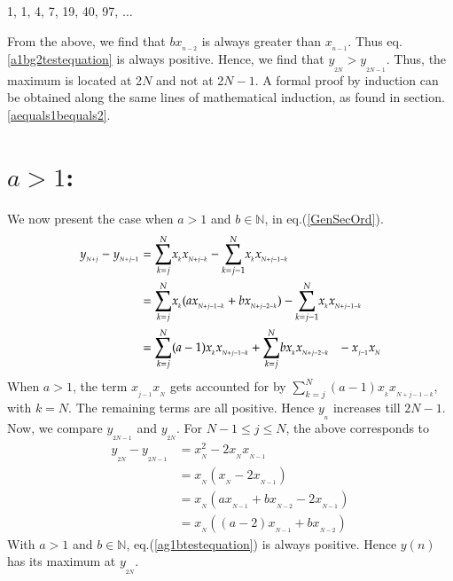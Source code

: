 \begin{multicols}{2}
\vspace{-.7cm}

\begin{center}
1, 1, 4, 7, 19, 40, 97, $\ldots$
\end{center}

\vspace{-.7cm}

From the above, we find that $b x_{_{n-2}}$ is always greater than $x_{_{n-1}}$. Thus eq.\ref{a1bg2testequation} is always positive. Hence, we find that $y_{_{2N}} > y_{_{2N-1}}$. Thus, the maximum is located at 2$N$ and not at 2$N-1$. A formal proof by induction can be obtained along the same lines of mathematical induction, as found in section. \ref{aequals1bequals2}.

\vspace{-.5cm}

\section*{\underline{{$a>1$}}:}
We now present the case when $a > 1$ and $b \in \mathbb N$, in eq.(\ref{GenSecOrd}).
{\fontsize{8}{9}\selectfont\begin{align}
y_{_{N+j}} - y_{_{N+j-1}} &= \displaystyle{\sum_{k=j}^{N}}x_{_{k}}x_{_{N+j-k}} -  \displaystyle{\sum_{k=j-1}^{N}}x_{_k}x_{_{N+j-1-k}}\nonumber\\
&=\displaystyle{\sum_{k=j}^{N}}x_{_{k}}(a x_{_{N+j-1-k}}+b x_{_{N+j-2-k}}) -  \displaystyle{\sum_{k=j-1}^{N}}x_{_k}x_{_{N+j-1-k}}\nonumber\\
&= \displaystyle{\sum_{k=j}^{N}}(a-1)x_{_{k}}x_{_{N+j-1-k}} + \displaystyle{\sum_{k=j}^{N}}bx_{_{k}}x_{_{N+j-2-k}} \hspace{0.1in}- x_{_{j-1}}x_{_N}\label{eq-18.8}
\end{align}}
When $a >1$, the term $x_{_{j-1}}x_{_N}$ gets accounted for by $\displaystyle{\sum_{k=j}^{N}}(a-1)x_{_{k}}x_{_{N+j-1-k}}$, with $k=N$. The remaining terms are all positive. Hence $y_{_n}$ increases till $2N-1$. Now, we compare $y_{_{2N-1}}$ and $y_{_{2N}}$.
For\hspace{0.1in} $N-1 \leq j \leq N$,\hspace{0.1in} the above corresponds to
\begin{align}
y_{_{2N}} - y_{_{2N-1}} &= x_{_N}^2 - 2x_{_N}x_{_{N-1}}\label{eq-18.9}\\
&= x_{_N}(x_{_N} - 2x_{_{N-1}})\label{eq-18.10}\\[.5cm]
&= x_{_N}(a x_{_{N-1}}+ b x_{_{N-2}}- 2x_{_{N-1}})\label{eq-18.11}\\
&= x_{_N}((a-2) x_{_{N-1}}+ b x_{_{N-2}})\label{eq-18.12}
\end{align} 
With $a > 1$ and $b \in \mathbb N$, eq.(\ref{ag1btestequation}) is always positive. Hence $y(n)$ has its maximum at $y_{_{2N}}$.


\end{multicols}
